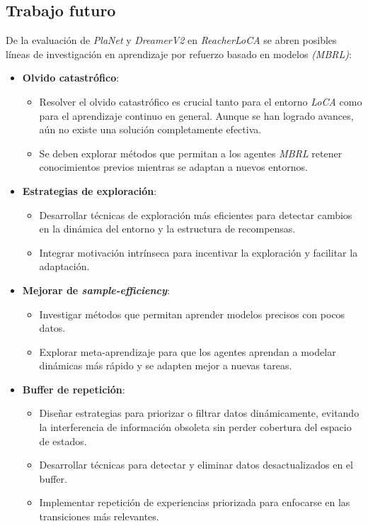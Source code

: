 \subsection{Trabajo futuro}\label{subsec:trabajo-futuro}

De la evaluación de \textit{PlaNet} y \textit{DreamerV2} en \textit{ReacherLoCA} se abren posibles líneas de investigación en aprendizaje por refuerzo basado en modelos \textit{(MBRL)}:

\begin{itemize}
    \item \textbf{Olvido catastrófico}:
    \begin{itemize}
        \item Resolver el olvido catastrófico es crucial tanto para el entorno \textit{LoCA} como para el aprendizaje continuo en general.
        Aunque se han logrado avances, aún no existe una solución completamente efectiva.
        \item Se deben explorar métodos que permitan a los agentes \textit{MBRL} retener conocimientos previos mientras se adaptan a nuevos entornos.
    \end{itemize}

    \item \textbf{Estrategias de exploración}:
    \begin{itemize}
        \item Desarrollar técnicas de exploración más eficientes para detectar cambios en la dinámica del entorno y la estructura de recompensas.
        \item Integrar motivación intrínseca para incentivar la exploración y facilitar la adaptación.
    \end{itemize}

    \item \textbf{Mejorar de \textit{sample-efficiency}}:
    \begin{itemize}
        \item Investigar métodos que permitan aprender modelos precisos con pocos datos.
        \item Explorar meta-aprendizaje para que los agentes aprendan a modelar dinámicas más rápido y se adapten mejor a nuevas tareas.
    \end{itemize}

    \item \textbf{Buffer de repetición}:
    \begin{itemize}
        \item Diseñar estrategias para priorizar o filtrar datos dinámicamente, evitando la interferencia de información obsoleta sin perder cobertura del espacio de estados.
        \item Desarrollar técnicas para detectar y eliminar datos desactualizados en el buffer.
        \item Implementar repetición de experiencias priorizada para enfocarse en las transiciones más relevantes.
    \end{itemize}


\end{itemize}
